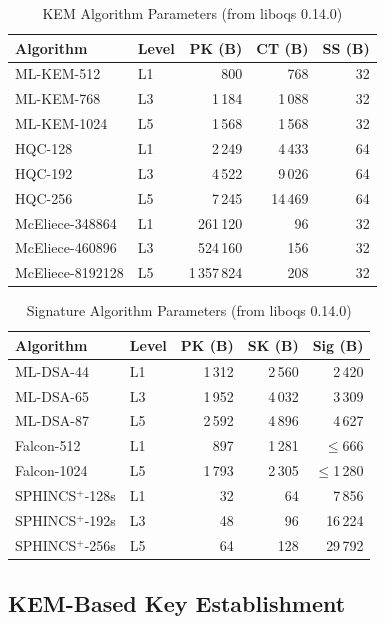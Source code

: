 \documentclass[conference]{IEEEtran}
\begin{document}
\begin{table}[t]
\centering
\caption{KEM Algorithm Parameters (from liboqs 0.14.0)}
\label{tab:kem-params}
\small
\begin{tabular}{@{}llrrr@{}}
\toprule
\textbf{Algorithm} & \textbf{Level} & \textbf{PK (B)} & \textbf{CT (B)} & \textbf{SS (B)} \\
\midrule
ML-KEM-512 & L1 & 800 & 768 & 32 \\
ML-KEM-768 & L3 & 1\,184 & 1\,088 & 32 \\
ML-KEM-1024 & L5 & 1\,568 & 1\,568 & 32 \\
HQC-128 & L1 & 2\,249 & 4\,433 & 64 \\
HQC-192 & L3 & 4\,522 & 9\,026 & 64 \\
HQC-256 & L5 & 7\,245 & 14\,469 & 64 \\
McEliece-348864 & L1 & 261\,120 & 96 & 32 \\
McEliece-460896 & L3 & 524\,160 & 156 & 32 \\
McEliece-8192128 & L5 & 1\,357\,824 & 208 & 32 \\
\bottomrule
\end{tabular}
\end{table}

\begin{table}[t]
\centering
\caption{Signature Algorithm Parameters (from liboqs 0.14.0)}
\label{tab:sig-params}
\small
\begin{tabular}{@{}llrrr@{}}
\toprule
\textbf{Algorithm} & \textbf{Level} & \textbf{PK (B)} & \textbf{SK (B)} & \textbf{Sig (B)} \\
\midrule
ML-DSA-44 & L1 & 1\,312 & 2\,560 & 2\,420 \\
ML-DSA-65 & L3 & 1\,952 & 4\,032 & 3\,309 \\
ML-DSA-87 & L5 & 2\,592 & 4\,896 & 4\,627 \\
Falcon-512 & L1 & 897 & 1\,281 & $\leq$666 \\
Falcon-1024 & L5 & 1\,793 & 2\,305 & $\leq$1\,280 \\
SPHINCS$^+$-128s & L1 & 32 & 64 & 7\,856 \\
SPHINCS$^+$-192s & L3 & 48 & 96 & 16\,224 \\
SPHINCS$^+$-256s & L5 & 64 & 128 & 29\,792 \\
\bottomrule
\end{tabular}
\end{table}

\subsection{KEM-Based Key Establishment}
\end{document}
